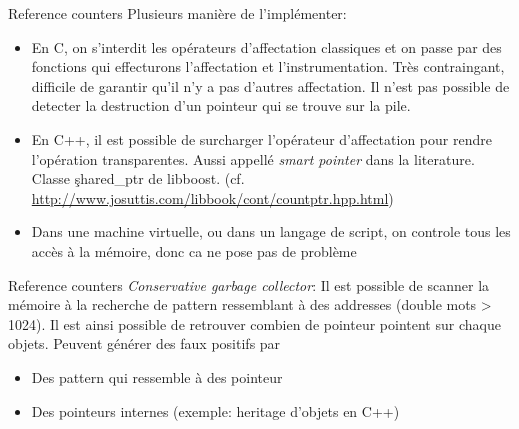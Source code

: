 \begin{frame}[fragile=singleslide]{Reference counters}
  Plusieurs manière de l'implémenter:
  \begin{itemize}
  \item En C, on s'interdit les opérateurs d'affectation classiques et
    on  passe  par  des  fonctions qui  effecturons  l'affectation  et
    l'instrumentation.  Très contraingant, difficile de garantir qu'il
    n'y a pas d'autres affectation.  Il n'est pas possible de detecter
    la destruction d'un pointeur qui se trouve sur la pile.
  \item   En  C++,   il   est  possible   de  surcharger   l'opérateur
    d'affectation   pour  rendre  l'opération   transparentes.   Aussi
    appellé   \emph{smart  pointer}   dans   la  literature.    Classe
    \c{shared_ptr}            de            libboost.             (cf.
    \url{http://www.josuttis.com/libbook/cont/countptr.hpp.html})
  \item Dans une  machine virtuelle, ou dans un  langage de script, on
    controle  tous les  accès à  la mémoire,  donc ca  ne pose  pas de
    problème
  \end{itemize}
\end{frame}

\begin{frame}[fragile=singleslide]{Reference counters}
  \emph{Conservative garbage collector}: Il est possible de scanner la
  mémoire  à  la recherche  de  pattern  ressemblant  à des  addresses
  (double mots > 1024).  Il est ainsi possible de retrouver combien de
  pointeur  pointent  sur  chaque  objets. Peuvent  générer  des  faux
  positifs par
  \begin{itemize}
  \item Des pattern qui ressemble à des pointeur
  \item Des pointeurs internes (exemple: heritage d'objets en C++)
  \end{itemize}
\end{frame}

